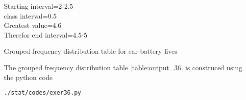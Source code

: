 Starting interval=2-2.5\\
class interval=0.5\\
Greatest value=4.6\\
Therefor end interval=4.5-5\\
\begin{table}[ht!]
\centering

\caption{Grouped frequency distribution table for car-battery lives}
\label{table:output_36}
\end{table}
The grouped frequency distribution table \ref{table:output_36} is construced using the python code
\begin{lstlisting}
./stat/codes/exer36.py
\end{lstlisting}
